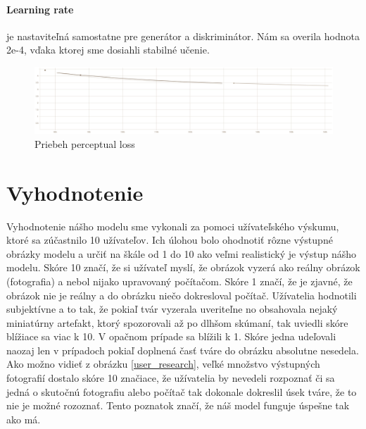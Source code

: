 \documentclass [11pt, a4paper]{article}
\begin{document}
			\paragraph{Learning rate} je nastaviteľná samostatne pre generátor a diskriminátor. Nám sa overila hodnota 2e-4, vďaka ktorej sme dosiahli stabilné učenie.
			
			\begin{figure}[h]
				\centering
				\includegraphics[width=1\linewidth]{img/validation-perceptual-loss-progress}
				\caption{Priebeh perceptual loss}
				\label{fig:validation-perceptual-loss-progress}
			\end{figure}
			
		
	\section{Vyhodnotenie}
		Vyhodnotenie nášho modelu sme vykonali za pomoci užívateľského výskumu, ktoré sa zúčastnilo 10 užívateľov. Ich úlohou bolo ohodnotiť rôzne výstupné obrázky modelu a určiť na škále od 1 do 10 ako veľmi realistický je výstup nášho modelu. Skóre 10 značí, že si užívateľ myslí, že obrázok vyzerá ako reálny obrázok (fotografia) a nebol nijako upravovaný počítačom. Skóre 1 značí, že je zjavné, že obrázok nie je reálny a do obrázku niečo dokresloval počítač. Užívatelia hodnotili subjektívne a to tak, že pokiaľ tvár vyzerala uveriteľne no obsahovala nejaký miniatúrny artefakt, ktorý spozorovali až po dlhšom skúmaní, tak uviedli skóre blížiace sa viac k 10. V opačnom prípade sa blížili k 1. Skóre jedna udeľovali naozaj len v prípadoch pokiaľ doplnená časť tváre do obrázku absolutne nesedela. Ako možno vidieť z obrázku \ref{user_research}, veľké množstvo výstupných fotografií dostalo skóre 10 značiace, že užívatelia by nevedeli rozpoznať či sa jedná o skutočnú fotografiu alebo počítač tak dokonale dokreslil úsek tváre, že to nie je možné rozoznať. Tento poznatok značí, že náš model funguje úspešne tak ako má.
		
\end{document}
